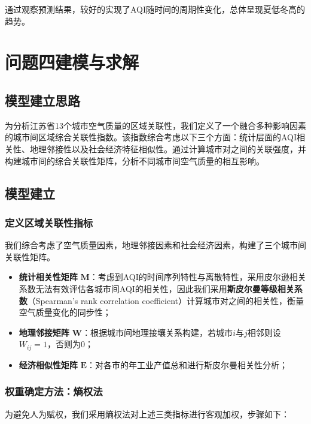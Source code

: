 \documentclass[a4paper,12pt]{article}
\begin{document}
	通过观察预测结果，较好的实现了AQI随时间的周期性变化，总体呈现夏低冬高的趋势。

			
	\section{问题四建模与求解}
	
	\subsection{模型建立思路}
	
	为分析江苏省13个城市空气质量的区域关联性，我们定义了一个融合多种影响因素的城市间区域综合关联性指数。该指数综合考虑以下三个方面：统计层面的AQI相关性、地理邻接性以及社会经济特征相似性。通过计算城市对之间的关联强度，并构建城市间的综合关联性矩阵，分析不同城市间空气质量的相互影响。
	
	\subsection{模型建立}
		\subsubsection{定义区域关联性指标}
	
	我们综合考虑了空气质量因素，地理邻接因素和社会经济因素，构建了三个城市间关联性矩阵。
	
	\begin{itemize}
		\item \textbf{统计相关性矩阵} $\mathbf{M}$：考虑到AQI的时间序列特性与离散特性，采用皮尔逊相关系数无法有效评估各城市间AQI的相关性，因此我们采用\textbf{斯皮尔曼等级相关系数}（Spearman’s rank correlation coefficient）计算城市对之间的相关性，衡量空气质量变化的同步性；
		
		\item \textbf{地理邻接矩阵} $\mathbf{W}$：根据城市间地理接壤关系构建，若城市$i$与$j$相邻则设$W_{ij}=1$，否则为0；
		
		\item \textbf{经济相似性矩阵} $\mathbf{E}$：对各市的年工业产值总和进行斯皮尔曼相关性分析；
	\end{itemize}
	
	\subsubsection{权重确定方法：熵权法}
	
	为避免人为赋权，我们采用熵权法对上述三类指标进行客观加权，步骤如下：
	
\end{document}
